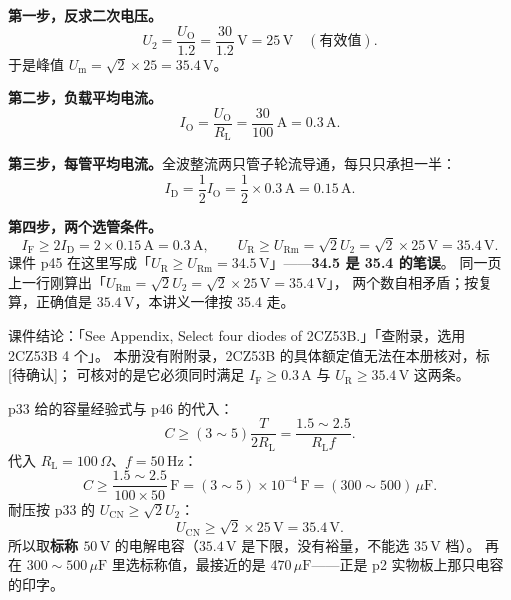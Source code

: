 \documentclass[11pt]{ctexart}
\begin{document}
\textbf{第一步，反求二次电压。}
\[ U_2=\frac{U_{\mathrm{O}}}{1.2}=\frac{30}{1.2}\,\mathrm{V}=25\,\mathrm{V}\quad(\text{有效值}) . \]
于是峰值 $U_{\mathrm{m}}=\sqrt2\times25=35.4\,\mathrm{V}$。


\textbf{第二步，负载平均电流。}
\[ I_{\mathrm{O}}=\frac{U_{\mathrm{O}}}{R_{\mathrm{L}}}=\frac{30}{100}\,\mathrm{A}=0.3\,\mathrm{A} . \]

\textbf{第三步，每管平均电流。}全波整流两只管子轮流导通，每只只承担一半：
\[ I_{\mathrm{D}}=\frac12I_{\mathrm{O}}=\frac12\times0.3\,\mathrm{A}=0.15\,\mathrm{A} . \]

\textbf{第四步，两个选管条件。}
\[ I_{\mathrm{F}}\ge 2I_{\mathrm{D}}=2\times0.15\,\mathrm{A}=0.3\,\mathrm{A},\qquad
U_{\mathrm{R}}\ge U_{\mathrm{Rm}}=\sqrt2U_2=\sqrt2\times25\,\mathrm{V}=35.4\,\mathrm{V} . \]
课件 p45 在这里写成「$U_{\mathrm{R}}\ge U_{\mathrm{Rm}}=34.5\,\mathrm{V}$」——\textbf{34.5 是 35.4 的笔误}。
同一页上一行刚算出「$U_{\mathrm{Rm}}=\sqrt2U_2=\sqrt2\times25\,\mathrm{V}=35.4\,\mathrm{V}$」，
两个数自相矛盾；按复算，正确值是 $35.4\,\mathrm{V}$，本讲义一律按 35.4 走。


课件结论：「See Appendix, Select four diodes of 2CZ53B.」「查附录，选用 2CZ53B 4 个」。
本册没有附附录，2CZ53B 的具体额定值无法在本册核对，标 [待确认]；
可核对的是它必须同时满足 $I_{\mathrm{F}}\ge0.3\,\mathrm{A}$ 与 $U_{\mathrm{R}}\ge35.4\,\mathrm{V}$ 这两条。


p33 给的容量经验式与 p46 的代入：
\[ C\ge(3\sim5)\frac{T}{2R_{\mathrm{L}}}=\frac{1.5\sim2.5}{R_{\mathrm{L}}f} . \]
代入 $R_{\mathrm{L}}=100\,\Omega$、$f=50\,\mathrm{Hz}$：
\[ C\ge\frac{1.5\sim2.5}{100\times50}\,\mathrm{F}
=(3\sim5)\times10^{-4}\,\mathrm{F}=(300\sim500)\,\mu\mathrm{F} . \]
耐压按 p33 的 $U_{\mathrm{CN}}\ge\sqrt2U_2$：
\[ U_{\mathrm{CN}}\ge\sqrt2\times25\,\mathrm{V}=35.4\,\mathrm{V} . \]
所以取\textbf{标称 $50\,\mathrm{V}$} 的电解电容（$35.4\,\mathrm{V}$ 是下限，没有裕量，不能选 $35\,\mathrm{V}$ 档）。
再在 $300\sim500\,\mu\mathrm{F}$ 里选标称值，最接近的是 $470\,\mu\mathrm{F}$——正是 p2 实物板上那只电容的印字。
\end{document}
